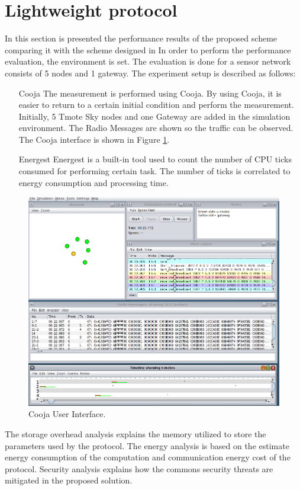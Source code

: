 \section{Lightweight protocol}
 In this section is presented the performance results of the proposed scheme comparing it with the scheme designed in \cite{Porambage2015}
In order to perform the performance evaluation, the environment is set.
The evaluation is done for a sensor network consists of 5 nodes and 1 gateway. 
The experiment setup is described as follows:
\begin{itemize}
    \item[Cooja] The measurement is performed using Cooja. By using Cooja, it is easier to return to a certain initial condition and perform the measurement. Initially, 5 Tmote Sky nodes and one Gateway  are added in the simulation environment. The Radio Messages are shown so the traffic can be observed. The Cooja interface is shown in Figure \ref{fig_cooja}.
    \item[Energest] Energest is a built-in tool used to count the number of CPU ticks consumed for performing certain task. The number of ticks is correlated to energy consumption and processing time.
\end{itemize}
\begin{figure}[!h]
\centering
\includegraphics[width=6in]{images/cooja.png}
\caption{Cooja User Interface.}
\label{fig_cooja}
\end{figure}

The storage overhead analysis explains the memory utilized to store the parameters used by the protocol. 
The energy analysis is based on the estimate energy consumption of the computation and communication energy cost of the protocol.
Security analysis explains how the commons security threats are mitigated in the proposed solution.

